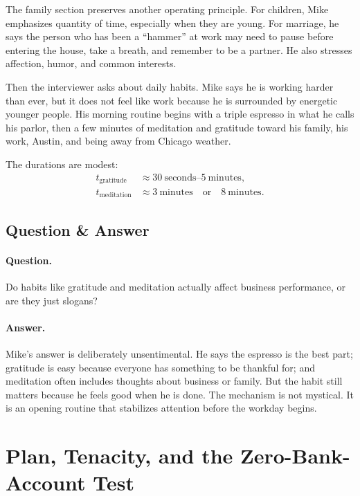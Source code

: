 The family section preserves another operating principle. For children, Mike emphasizes quantity of time, especially when they are young. For marriage, he says the person who has been a ``hammer'' at work may need to pause before entering the house, take a breath, and remember to be a partner. He also stresses affection, humor, and common interests.

Then the interviewer asks about daily habits. Mike says he is working harder than ever, but it does not feel like work because he is surrounded by energetic younger people. His morning routine begins with a triple espresso in what he calls his parlor, then a few minutes of meditation and gratitude toward his family, his work, Austin, and being away from Chicago weather.

The durations are modest:
\begin{align}
t_{\text{gratitude}} &\approx 30\ \text{seconds}\text{--}5\ \text{minutes},\\
t_{\text{meditation}} &\approx 3\ \text{minutes}\quad\text{or}\quad 8\ \text{minutes}.
\end{align}

\subsection{Question \& Answer}

\paragraph{Question.}
Do habits like gratitude and meditation actually affect business performance, or are they just slogans?

\paragraph{Answer.}
Mike's answer is deliberately unsentimental. He says the espresso is the best part; gratitude is easy because everyone has something to be thankful for; and meditation often includes thoughts about business or family. But the habit still matters because he feels good when he is done. The mechanism is not mystical. It is an opening routine that stabilizes attention before the workday begins.

\section{Plan, Tenacity, and the Zero-Bank-Account Test}

